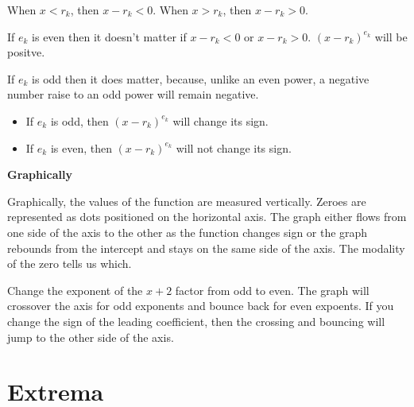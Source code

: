 \documentclass{ximera}
\begin{document}
When $x<r_k$, then $x-r_k <0$.  When $x>r_k$, then $x-r_k >0$.

If $e_k$ is even then it doesn't matter if $x-r_k <0$ or $x-r_k >0$. $(x-r_k)^{e_k}$ will be positve. 

If $e_k$ is odd then it does matter, because, unlike an even power, a negative number raise to an odd power will remain negative.





\begin{itemize}
\item If $e_k$ is odd, then $(x-r_k)^{e_k}$ will change its sign.
\item If $e_k$ is even, then $(x-r_k)^{e_k}$ will not change its sign.
\end{itemize}









\textbf{\large Graphically}


Graphically, the values of the function are measured vertically. Zeroes are represented as dots positioned on the horizontal axis.  The graph either flows from one side of the axis to the other as the function changes sign or the graph rebounds from the intercept and stays on the same side of the axis.  The modality of the zero tells us which.






\begin{example}

Change the exponent of the $x+2$ factor from odd to even.  The graph will crossover the axis for odd exponents and bounce back for even expoents.  If you change the sign of the leading coefficient, then the crossing and bouncing will jump to the other side of the axis.



\begin{center}
\end{center}

\end{example}






\section{Extrema}
\end{document}

